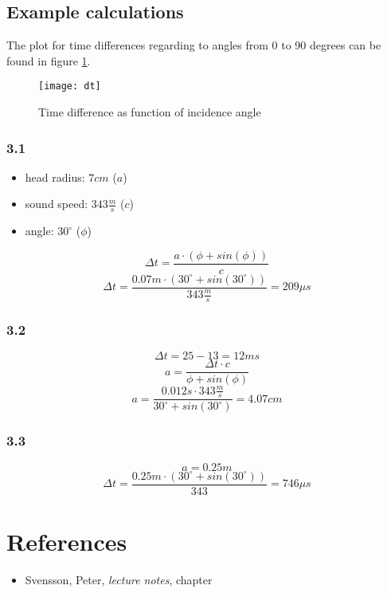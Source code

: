 \documentclass{article}
\begin{document}
\subsection{Example calculations}
The plot for time differences regarding to angles from 0 to 90 degrees can be found in figure \ref{fig:dt}.
\begin{figure}[htbp]
\begin{center}
\texttt{[image: dt]}
\caption{Time difference as function of incidence angle}
\label{fig:dt}
\end{center}
\end{figure}
\subsubsection{3.1}
\begin{itemize}
\item head radius: $7cm$ ($a$)
\item sound speed: $343\frac{m}{s}$ ($c$)
\item angle: $30^\circ$ ($\phi$)
\end{itemize}
\begin{equation}
\Delta t=\frac{a\cdot(\phi+sin(\phi))}{c}
\end{equation}
$$\Delta t=\frac{0.07m\cdot(30^\circ+sin(30^\circ))}{343\frac{m}{s}}=209\mu s $$

\subsubsection{3.2}
$$\Delta t=25-13=12ms$$
\begin{equation}
a=\frac{\Delta t\cdot c}{\phi+sin(\phi)}
\end{equation}
$$ a=\frac{0.012s\cdot 343\frac{m}{s}}{30^\circ+sin(30^\circ)}=4.07cm$$
\subsubsection{3.3}
$$a=0.25m$$
$$\Delta t=\frac{0.25m\cdot(30^\circ+sin(30^\circ))}{343}=746\mu s$$
\newpage
\section{References}
\footnotesize{
\begin{itemize}
\item Svensson, Peter, \textit{lecture notes}, chapter 
\end{itemize}
}
\end{document}
